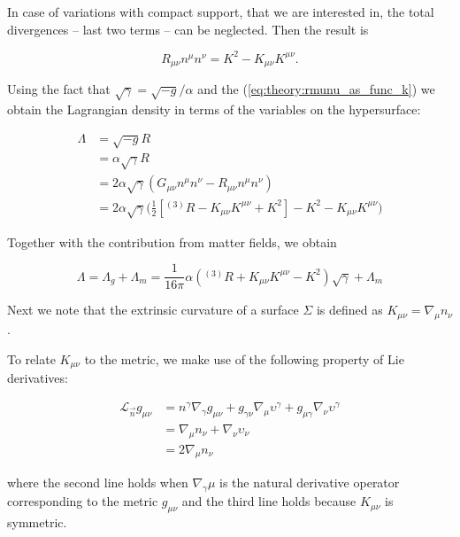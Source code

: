 In case of variations with compact support, that we are interested in, the total divergences -- last two terms -- can be neglected. 
Then the result is

\begin{equation}
R_{\mu\nu}n^{\mu}n^{\nu}= K^2 - K_{\mu\nu}K^{\mu\nu}.
\label{eq:theory:rmunu_as_func_k}
\end{equation}


Using the fact that $\sqrt{\gamma}=\sqrt{-g}/\alpha$ and the (\ref{eq:theory:rmunu_as_func_k}) we obtain the Lagrangian density in terms of the variables on the hypersurface:

\begin{align}
\Lambda &= \sqrt{-g}R \\
&= \alpha\sqrt{\gamma}R \\
&= 2\alpha\sqrt{\gamma}(G_{\mu\nu}n^{\mu}n^{\nu} - R_{\mu\nu}n^{\mu}n^{\nu})\\ 
&= 2\alpha\sqrt{\gamma}\Big(\frac{1}{2}[{^{(3)}R} - K_{\mu\nu}K^{\mu\nu} + K^2] - K^2 - K_{\mu\nu}K^{\mu\nu}\Big)
\end{align}

Together with the contribution from matter fields, we obtain

\begin{equation}
\Lambda = \Lambda_g+\Lambda_m= \frac{1}{16\pi}\alpha({^{(3)}R} + K_{\mu\nu}K^{\mu\nu} - K^2)\sqrt{\gamma}+\Lambda_m
\end{equation}

Next we note that the extrinsic curvature of a
surface $\Sigma$ is defined as $K_{\mu\nu} = \nabla_{\mu}n_{\nu}$. 

To relate $K_{\mu\nu}$ to the metric, we make use of the following property of Lie derivatives:

\begin{align}
\mathcal{L}_{\vec{n}}g_{\mu\nu} &= n^{\gamma}\nabla_{\gamma}g_{\mu\nu} + g_{\gamma\nu}\nabla_{\mu}\upsilon^{\gamma} + g_{\mu\gamma}\nabla_{\nu}\upsilon^{\gamma} \\
&= \nabla_{\mu}n_{\nu}+\nabla_{\nu}\upsilon_{\nu} \\
&=2\nabla_{\mu}n_{\nu}
\end{align}

where the second line holds when $\nabla_{\gamma}\mu$ is the natural derivative operator corresponding to the metric $g_{\mu\nu}$ and the third line holds because $K_{\mu\nu}$ is symmetric.

